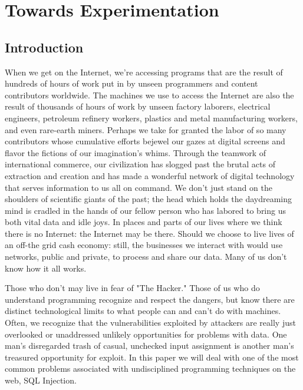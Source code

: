\chapter{Towards Experimentation}

\section{Introduction}
\label{intro}
When we get on the Internet, we're accessing programs that are the result of hundreds of hours of work put in by unseen programmers and content contributors worldwide.  The machines we use to access the Internet are also the result of thousands of hours of work by unseen factory laborers, electrical engineers, petroleum refinery workers, plastics and metal manufacturing workers, and even rare-earth miners. Perhaps we take for granted the labor of so many contributors whose cumulative efforts bejewel our gazes at digital screens and flavor the fictions of our imagination's whims. Through the teamwork of international commerce, our civilization has slogged past the brutal acts of extraction and creation and has made a wonderful network of digital technology that serves information to us all on command.  We don't just stand on the shoulders of scientific giants of the past; the head which holds the daydreaming mind is cradled in the hands of our fellow person who has labored to bring us both vital data and idle joys. In places and parts of our lives where we think there is no Internet:  the Internet may be there.  Should we choose to live lives of an off-the grid cash economy:  still, the businesses we interact with would use networks, public and private, to process and share our data.  Many of us don't know how it all works.

Those who don't may live in fear of "The Hacker."  Those of us who do understand programming recognize and respect the dangers, but know there are distinct technological limits to what people can and can't do with machines.  Often, we recognize that the vulnerabilities exploited by attackers are really just overlooked or unaddressed unlikely opportunities for problems with data.  One man's disregarded trash of casual, unchecked input assignment is another man's treasured opportunity for  \gls{exploit}.  In this paper we will deal with one of the most common problems associated with undisciplined programming techniques on the web, SQL Injection.

